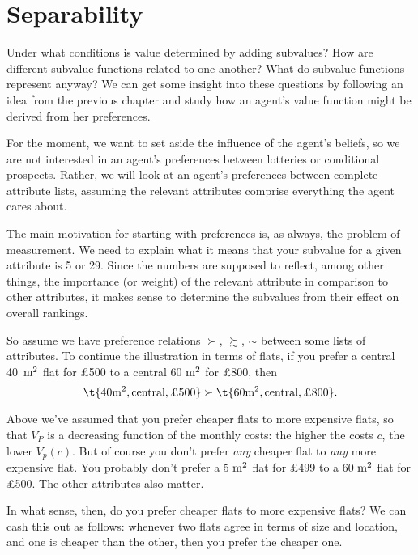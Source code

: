 \section{Separability}

Under what conditions is value determined by adding subvalues? How are
different subvalue functions related to one another? What do subvalue
functions represent anyway? We can get some insight into these
questions by following an idea from the previous chapter and study how
an agent's value function might be derived from her preferences.

For the moment, we want to set aside the influence of the agent's
beliefs, so we are not interested in an agent's preferences between
lotteries or conditional prospects. Rather, we will look at an agent's
preferences between complete attribute lists, assuming the relevant
attributes comprise everything the agent cares about. 

The main motivation for starting with preferences is, as always, the
problem of measurement. We need to explain what it means that your
subvalue for a given attribute is 5 or 29. Since the numbers are
supposed to reflect, among other things, the importance (or weight) of
the relevant attribute in comparison to other attributes, it makes
sense to determine the subvalues from their effect on overall
rankings.
 
So assume we have preference relations $\succ$, $\succsim$, $\sim$
between some lists of attributes. To continue the illustration in
terms of flats, if you prefer a central \mbox{40 $\text{m}^2$} flat for £500 to a
central 60 $\text{m}^2$ for £800, then
\[
 \t{40 \m^2, \text{central}, \text{£500}} \succ
 \t{60 \m^2, \text{central}, \text{£800}}.
\]

Above we've assumed that you prefer cheaper flats to more expensive
flats, so that $V_P$ is a decreasing function of the monthly costs:
the higher the costs $c$, the lower $V_p(c)$. But of course you don't
prefer \emph{any} cheaper flat to \emph{any} more expensive flat. You
probably don't prefer a 5 $\text{m}^2$ flat for £499 to a 60 $\text{m}^2$ flat 
for £500. The other attributes also matter.

In what sense, then, do you prefer cheaper flats to more expensive
flats? We can cash this out as follows: whenever two flats agree in
terms of size and location, and one is cheaper than the other, then
you prefer the cheaper one. 

